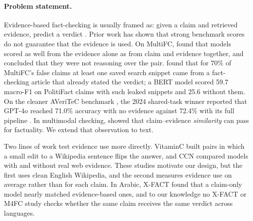 \documentclass[11pt,a4paper]{article}
\begin{document}
\paragraph{Problem statement.}
Evidence-based fact-checking is usually framed as: given a claim and retrieved evidence, predict a verdict \citep{thorne2018fever,augenstein2019multifc}. Prior work has shown that strong benchmark scores do not guarantee that the evidence is used. On MultiFC, \citet{hansen2021reason} found that models scored as well from the evidence alone as from claim and evidence together, and concluded that they were not reasoning over the pair. \citet{glockner2022missing} found that for 70\% of MultiFC's false claims at least one saved search snippet came from a fact-checking article that already stated the verdict; a BERT model scored 59.7 macro-F1 on PolitiFact claims with such leaked snippets and 25.6 without them. On the cleaner AVeriTeC benchmark \citep{schlichtkrull2023averitec}, the 2024 shared-task winner reported that GPT-4o reached 71.0\% accuracy with no evidence against 72.4\% with its full pipeline \citep{rothermel2024infact}. In multimodal checking, \citet{papadopoulos2025similarity} showed that claim--evidence \emph{similarity} can pass for factuality. We extend that observation to text.

Two lines of work test evidence use more directly. VitaminC \citep{schuster2021vitaminc} built pairs in which a small edit to a Wikipedia sentence flips the answer, and CCN \citep{abdelnabi2022ccn} compared models with and without real web evidence. These studies motivate our design, but the first uses clean English Wikipedia, and the second measures evidence use on average rather than for each claim. In Arabic, X-FACT \citep{gupta2021xfact} found that a claim-only model nearly matched evidence-based ones, and to our knowledge no X-FACT or M4FC study checks whether the same claim receives the same verdict across languages.
\end{document}
